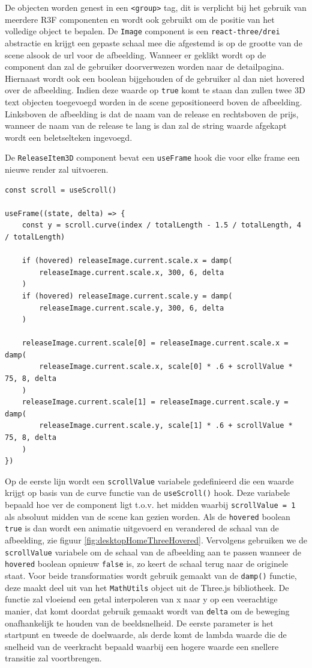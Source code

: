 De objecten worden genest in een \texttt{<group>} tag, dit is verplicht bij het gebruik van meerdere R3F componenten en wordt ook gebruikt om de positie van het volledige object te bepalen.
De \texttt{Image} component is een \texttt{react-three/drei} abstractie en krijgt een gepaste schaal mee die afgestemd is op de grootte van de scene alsook de url voor de afbeelding. Wanneer er geklikt wordt op de component dan zal de gebruiker doorverwezen worden naar de detailpagina. Hiernaast wordt ook een boolean bijgehouden of de gebruiker al dan niet hovered over de afbeelding. Indien deze waarde op \texttt{true} komt te staan dan zullen twee 3D text objecten toegevoegd worden in de scene gepositioneerd boven de afbeelding. Linksboven de afbeelding is dat de naam van de release en rechtsboven de prijs, wanneer de naam van de release te lang is dan zal de string waarde afgekapt wordt een beletselteken ingevoegd.

De \texttt{ReleaseItem3D} component bevat een \texttt{useFrame} hook die voor elke frame een nieuwe render zal uitvoeren. 
\newline

\begin{BVerbatim}
const scroll = useScroll()

useFrame((state, delta) => {
	const y = scroll.curve(index / totalLength - 1.5 / totalLength, 4 / totalLength)
	
	if (hovered) releaseImage.current.scale.x = damp(
		releaseImage.current.scale.x, 300, 6, delta
	)
	if (hovered) releaseImage.current.scale.y = damp(
		releaseImage.current.scale.y, 300, 6, delta
	)
	
	releaseImage.current.scale[0] = releaseImage.current.scale.x = damp(
		releaseImage.current.scale.x, scale[0] * .6 + scrollValue * 75, 8, delta
	)
	releaseImage.current.scale[1] = releaseImage.current.scale.y = damp(
		releaseImage.current.scale.y, scale[1] * .6 + scrollValue * 75, 8, delta
	)
})
\end{BVerbatim}

Op de eerste lijn wordt een \texttt{scrollValue} variabele gedefinieerd die een waarde krijgt op basis van de curve functie van de \texttt{useScroll()} hook. Deze variabele bepaald hoe ver de component ligt t.o.v. het midden waarbij \texttt{scrollValue = 1} als absoluut midden van de scene kan gezien worden. Als de \texttt{hovered} boolean \texttt{true} is dan wordt een animatie uitgevoerd en verandered de schaal van de afbeelding, zie figuur \ref{fig:desktopHomeThreeHovered}. Vervolgens gebruiken we de \texttt{scrollValue} variabele om de schaal van de afbeelding aan te passen wanneer de \texttt{hovered} boolean opnieuw \texttt{false} is, zo keert de schaal terug naar de originele staat. 
Voor beide transformaties wordt gebruik gemaakt van de \texttt{damp()} functie, deze maakt deel uit van het \texttt{MathUtils} object uit de Three.js bibliotheek. De functie zal vloeiend een getal interpoleren van x naar y op een veerachtige manier, dat komt doordat gebruik gemaakt wordt van \texttt{delta} om de beweging onafhankelijk te houden van de beeldsnelheid. De eerste parameter is het startpunt en tweede de doelwaarde, als derde komt de lambda waarde die de snelheid van de veerkracht bepaald waarbij een hogere waarde een snellere transitie zal voortbrengen.

